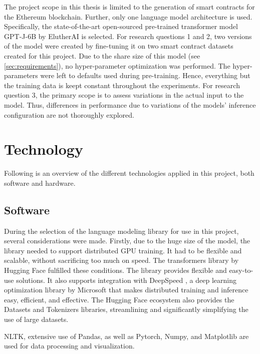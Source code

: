 The project scope in this thesis is limited to the generation of smart contracts for the Ethereum blockchain. Further, only one language model architecture is used. Specifically, the state-of-the-art open-sourced pre-trained transformer model GPT-J-6B by ElutherAI is selected. For research questions 1 and 2, two versions of the model were created by fine-tuning it on two smart contract datasets created for this project. Due to the share size of this model (see \cref{sec:requirements}), no hyper-parameter optimization was performed. The hyper-parameters were left to defaults used during pre-training. Hence, everything but the training data is keept constant throughout the experiments. For research question 3, the primary scope is to assess variations in the actual input to the model. Thus, differences in performance due to variations of the models' inference configuration are not thoroughly explored.


\section{Technology}
\label{sec:technology}
Following is an overview of the different technologies applied in this project, both software and hardware.

\subsection{Software}
\label{sec:software}
During the selection of the language modeling library for use in this project, several considerations were made. Firstly, due to the huge size of the model, the library needed to support distributed GPU training. It had to be flexible and scalable, without sacrificing too much on speed. The transformers \cite{transformers} library by Hugging Face \cite{hugging-face} fulfilled these conditions. The library provides flexible and easy-to-use solutions. It also supports integration with DeepSpeed \cite{deepspeed}, a deep learning optimization library by Microsoft \cite{microsoft} that makes distributed training and inference easy, efficient, and effective. The Hugging Face ecosystem also provides the Datasets and Tokenizers libraries, streamlining and significantly simplifying the use of large datasets.

NLTK, extensive use of Pandas, as well as Pytorch, Numpy, and Matplotlib are used for data processing and visualization. 

